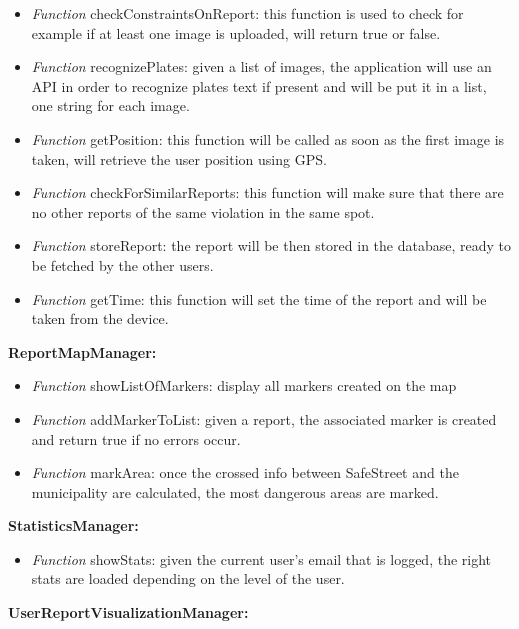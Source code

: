 \documentclass[../RASD.tex]{subfiles}
\begin{document}
    \begin{itemize}
        \item     \textit{Function} checkConstraintsOnReport: this function is used to check for example if at least one image is uploaded, will return true or false.
        \item     \textit{Function} recognizePlates: given a list of images, the application will use an API in order to recognize plates text
        if present and will be put it in a list, one string for each image.
        \item     \textit{Function} getPosition: this function will be called as soon as the first image is taken, will retrieve the user position using GPS.
        \item     \textit{Function} checkForSimilarReports: this function will make sure that there are no other reports of the same violation in the same spot.
        \item     \textit{Function} storeReport: the report will be then stored in the database, ready to be fetched by the other users.
        \item     \textit{Function} getTime: this function will set the time of the report and will be taken from the device.
    \end{itemize}
    \textbf{ReportMapManager:}
    \begin{itemize}
        \item     \textit{Function} showListOfMarkers: display all markers created on the map
        \item     \textit{Function} addMarkerToList: given a report, the associated marker is created and return true if no errors occur.
        \item     \textit{Function} markArea: once the crossed info between SafeStreet and the municipality are calculated, the most dangerous areas are marked.
    \end{itemize}
    \textbf{StatisticsManager:}
    \begin{itemize}
        \item     \textit{Function} showStats: given the current user’s email that is logged, the right stats are loaded depending on the level of the user.
    \end{itemize}
    \textbf{UserReportVisualizationManager:}
\end{document}
